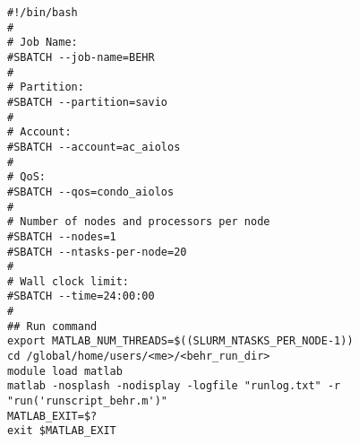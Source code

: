 \documentclass[12pt]{article}
\begin{document}
\lstset{numbers=left,basicstyle=\scriptsize\ttfamily}
\begin{lstlisting}
#!/bin/bash
#
# Job Name:
#SBATCH --job-name=BEHR
#
# Partition:
#SBATCH --partition=savio
#
# Account:
#SBATCH --account=ac_aiolos
# 
# QoS:
#SBATCH --qos=condo_aiolos
#
# Number of nodes and processors per node
#SBATCH --nodes=1
#SBATCH --ntasks-per-node=20
#
# Wall clock limit:
#SBATCH --time=24:00:00
#
## Run command
export MATLAB_NUM_THREADS=$((SLURM_NTASKS_PER_NODE-1))
cd /global/home/users/<me>/<behr_run_dir>
module load matlab
matlab -nosplash -nodisplay -logfile "runlog.txt" -r "run('runscript_behr.m')"
MATLAB_EXIT=$?
exit $MATLAB_EXIT
\end{lstlisting}
\lstset{numbers=none,basicstyle=\ttfamily}
\end{document}
